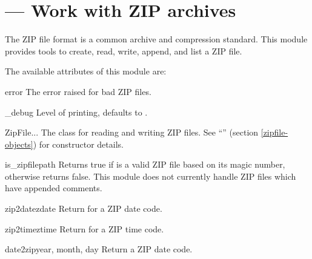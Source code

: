\section{ ---
         Work with ZIP archives}



The ZIP file format is a common archive and compression standard.
This module provides tools to create, read, write, append, and list a
ZIP file.

The available attributes of this module are:

\begin{excdesc}{error}
  The error raised for bad ZIP files.
\end{excdesc}

\begin{datadesc}{_debug}
  Level of printing, defaults to .
\end{datadesc}

\begin{classdesc}{ZipFile}{...}
  The class for reading and writing ZIP files.  See
  ``'' (section \ref{zipfile-objects}) for
  constructor details.
\end{classdesc}

\begin{funcdesc}{is_zipfile}{path} 
  Returns true if  is a valid ZIP file based on its magic
  number, otherwise returns false.  This module does not currently
  handle ZIP files which have appended comments.
\end{funcdesc}

\begin{funcdesc}{zip2date}{zdate}
  Return  for a ZIP date
  code.
\end{funcdesc}

\begin{funcdesc}{zip2time}{ztime}
  Return  for a ZIP
  time code.
\end{funcdesc}

\begin{funcdesc}{date2zip}{year, month, day}
  Return a ZIP date code. 
\end{funcdesc}

